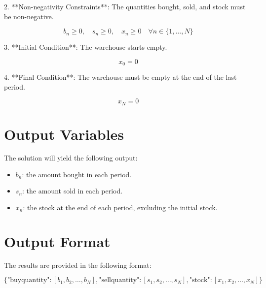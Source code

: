 \documentclass{article}
\begin{document}
2. **Non-negativity Constraints**: The quantities bought, sold, and stock must be non-negative.

\[
b_n \geq 0, \quad s_n \geq 0, \quad x_n \geq 0 \quad \forall n \in \{1, \ldots, N\}
\]

3. **Initial Condition**: The warehouse starts empty.

\[
x_0 = 0
\]

4. **Final Condition**: The warehouse must be empty at the end of the last period.

\[
x_N = 0
\]

\section*{Output Variables}

The solution will yield the following output:

\begin{itemize}
    \item \(b_n\): the amount bought in each period.
    \item \(s_n\): the amount sold in each period.
    \item \(x_n\): the stock at the end of each period, excluding the initial stock.
\end{itemize}

\section*{Output Format}

The results are provided in the following format:

\[
\{
    \text{"buyquantity"}: [b_1, b_2, \ldots, b_N],
    \text{"sellquantity"}: [s_1, s_2, \ldots, s_N],
    \text{"stock"}: [x_1, x_2, \ldots, x_N]
\}
\]
\end{document}
